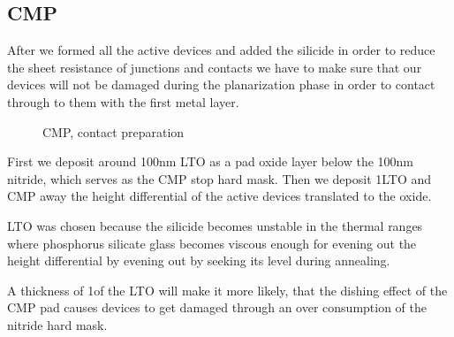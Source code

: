 \newpage

\subsection{CMP}\label{chapter_silicide_and_cmp}

After we formed all the active devices and added the silicide in order to reduce the sheet resistance of junctions and contacts we have to make sure that
our devices will not be damaged during the planarization phase in order to contact through to them with the first metal layer.

\begin{figure}[H]
	\centering
	\begin{tikzpicture}[node distance = 3cm, auto, thick,scale=\CrossSectionOnly, every node/.style={transform shape}]
		
	\end{tikzpicture}
	\begin{tikzpicture}[node distance = 3cm, auto, thick,scale=\CrossSectionOnly, every node/.style={transform shape}]
		
	\end{tikzpicture}
	\begin{tikzpicture}[node distance = 3cm, auto, thick,scale=\CrossSectionOnly, every node/.style={transform shape}]
		
	\end{tikzpicture}
	\caption{CMP, contact preparation}
\end{figure}

First we deposit around 100nm LTO as a pad oxide layer below the 100nm nitride, which serves as the CMP stop hard mask.
Then we deposit 1\um LTO and CMP away the height differential of the active devices translated to the oxide.

LTO was chosen because the silicide becomes unstable in the thermal ranges where phosphorus silicate glass becomes viscous enough
for evening out the height differential by evening out by seeking its level during annealing.

A thickness of 1\um of the LTO will make it more likely, that the dishing effect of the CMP pad causes devices to get damaged
through an over consumption of the nitride hard mask.
